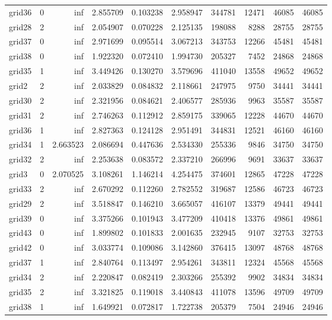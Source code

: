 \documentclass[../../../thesis.tex]{subfiles}
\begin{document}
\begin{longtable}{|l|r|r|r|r|r|r|r|r|r|}
grid36 & 0 & inf & 2.855709 & 0.103238 & 2.958947 & 344781 & 12471 & 46085 & 46085 \\
grid28 & 2 & inf & 2.054907 & 0.070228 & 2.125135 & 198088 & 8288 & 28755 & 28755 \\
grid37 & 0 & inf & 2.971699 & 0.095514 & 3.067213 & 343753 & 12266 & 45481 & 45481 \\
grid38 & 0 & inf & 1.922320 & 0.072410 & 1.994730 & 205327 & 7452 & 24868 & 24868 \\
grid35 & 1 & inf & 3.449426 & 0.130270 & 3.579696 & 411040 & 13558 & 49652 & 49652 \\
grid2 & 2 & inf & 2.033829 & 0.084832 & 2.118661 & 247975 & 9750 & 34441 & 34441 \\
grid30 & 2 & inf & 2.321956 & 0.084621 & 2.406577 & 285936 & 9963 & 35587 & 35587 \\
grid31 & 2 & inf & 2.746263 & 0.112912 & 2.859175 & 339065 & 12228 & 44670 & 44670 \\
grid36 & 1 & inf & 2.827363 & 0.124128 & 2.951491 & 344831 & 12521 & 46160 & 46160 \\
grid34 & 1 & 2.663523 & 2.086694 & 0.447636 & 2.534330 & 255336 & 9846 & 34750 & 34750 \\
grid32 & 2 & inf & 2.253638 & 0.083572 & 2.337210 & 266996 & 9691 & 33637 & 33637 \\
grid3 & 0 & 2.070525 & 3.108261 & 1.146214 & 4.254475 & 374601 & 12865 & 47228 & 47228 \\
grid33 & 2 & inf & 2.670292 & 0.112260 & 2.782552 & 319687 & 12586 & 46723 & 46723 \\
grid29 & 2 & inf & 3.518847 & 0.146210 & 3.665057 & 416107 & 13379 & 49441 & 49441 \\
grid39 & 0 & inf & 3.375266 & 0.101943 & 3.477209 & 410418 & 13376 & 49861 & 49861 \\
grid43 & 0 & inf & 1.899802 & 0.101833 & 2.001635 & 232945 & 9107 & 32753 & 32753 \\
grid42 & 0 & inf & 3.033774 & 0.109086 & 3.142860 & 376415 & 13097 & 48768 & 48768 \\
grid37 & 1 & inf & 2.840764 & 0.113497 & 2.954261 & 343811 & 12324 & 45568 & 45568 \\
grid34 & 2 & inf & 2.220847 & 0.082419 & 2.303266 & 255392 & 9902 & 34834 & 34834 \\
grid35 & 2 & inf & 3.321825 & 0.119018 & 3.440843 & 411078 & 13596 & 49709 & 49709 \\
grid38 & 1 & inf & 1.649921 & 0.072817 & 1.722738 & 205379 & 7504 & 24946 & 24946 \\

\end{longtable}
\end{document}
